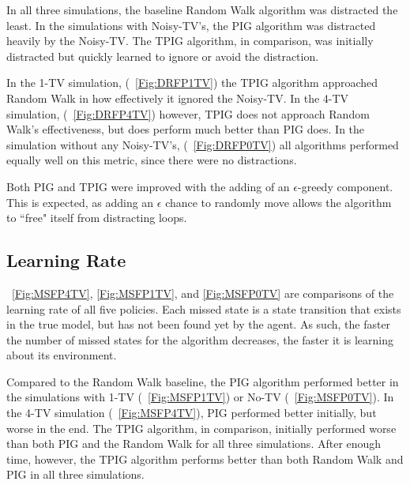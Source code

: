 \documentclass[letterpaper]{article} %
\begin{document}
In all three simulations, the baseline Random Walk algorithm was distracted the least. In the simulations with Noisy-TV's, the PIG algorithm was distracted heavily by the Noisy-TV. The TPIG algorithm, in comparison, was initially distracted but quickly learned to ignore or avoid the distraction.

In the 1-TV simulation, (\figurename~\ref{Fig:DRFP1TV}) the TPIG algorithm approached Random Walk in how effectively it ignored the Noisy-TV. In the 4-TV simulation, (\figurename~\ref{Fig:DRFP4TV}) however, TPIG does not approach Random Walk's effectiveness, but does perform much better than PIG does. In the simulation without any Noisy-TV's, (\figurename~\ref{Fig:DRFP0TV}) all algorithms performed equally well on this metric, since there were no distractions.


Both PIG and TPIG were improved with the adding of an $\epsilon$-greedy component. This is expected, as adding an $\epsilon$ chance to randomly move allows the algorithm to ``free" itself from distracting loops.



\subsection{Learning Rate}
\figurename~\ref{Fig:MSFP4TV}, \ref{Fig:MSFP1TV}, and \ref{Fig:MSFP0TV} are comparisons of the learning rate of all five policies. Each missed state is a state transition that exists in the true model, but has not been found yet by the agent. As such, the faster the number of missed states for the algorithm decreases, the faster it is learning about its environment.

Compared to the Random Walk baseline, the PIG algorithm performed better in the simulations with 1-TV (\figurename~\ref{Fig:MSFP1TV}) or No-TV (\figurename~\ref{Fig:MSFP0TV}). In the 4-TV simulation (\figurename~\ref{Fig:MSFP4TV}), PIG performed better initially, but worse in the end. The TPIG algorithm, in comparison, initially performed worse than both PIG and the Random Walk for all three simulations. After enough time, however, the TPIG algorithm performs better than both Random Walk and PIG in all three simulations.
\end{document}
